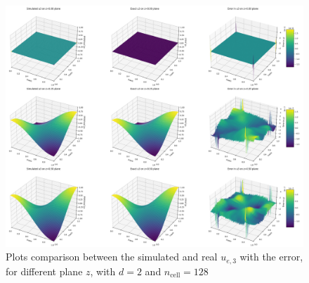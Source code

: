 \documentclass[a4paper,12pt,twoside]{report}
\begin{document}
\begin{figure}[!h]
	\centering
	\includegraphics[width=0.8\linewidth]{3d_plots_degree_2_non_mixed_ncell=128_function_u3_planes_z.png}
	\caption{Plots comparison between the simulated and real $u_{e,3}$ with the error, for different plane $z$, with $d=2$ and $n_{\text{cell}} = 128$}
	\label{fig:3D_plots_mixed_BC}
\end{figure}
\end{document}
